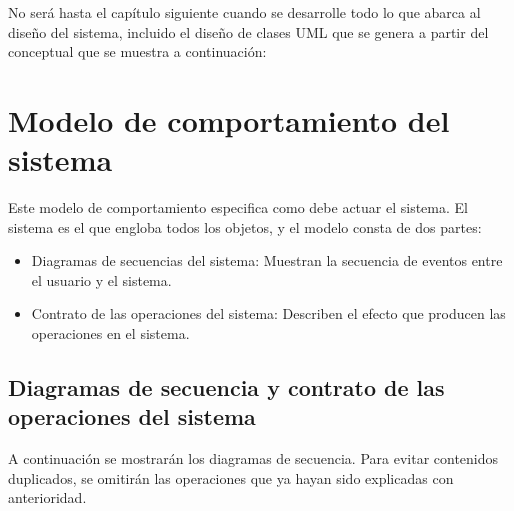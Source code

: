 No será hasta el capítulo siguiente cuando se desarrolle todo lo que abarca al diseño del sistema, incluido el diseño de clases UML que se genera a partir del conceptual que se muestra a continuación:

\section{Modelo de comportamiento del sistema}

Este modelo de comportamiento especifica como debe actuar el sistema. El sistema es el que engloba todos los objetos, y el modelo consta de dos partes:

\begin{itemize}
\item Diagramas de secuencias del sistema: Muestran la secuencia de eventos entre el usuario y el sistema.
\item Contrato de las operaciones del sistema: Describen el efecto que producen las operaciones en el sistema.
\end{itemize}

\subsection{Diagramas de secuencia y contrato de las operaciones del sistema}

A continuación se mostrarán los diagramas de secuencia. Para evitar contenidos duplicados, se omitirán las operaciones que ya hayan sido explicadas con anterioridad.














